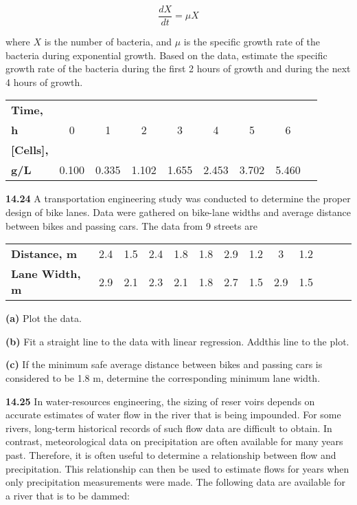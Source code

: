 \documentclass[../main.tex]{subfiles}
\begin{document}
\begin{multicols}{2}
	$$\frac{d X}{dt} = \mu X$$

	\noindent where $X$ is the number of bacteria, and $\mu$ is the specific
	growth rate of the bacteria during exponential growth. Based
	on the data, estimate the specific growth rate of the bacteria
	during the first 2 hours of growth and during the next 4 hours
	of growth.

	\noindent \begin{tabular}{l c c c c c c c c}
		\textbf{Time,} \\
		\textbf{h} &  0 &  1 &  2 &  3 &  4 &  5 &  6 \\
		\textbf{[Cells],} \\
		\textbf{g/L} & 0.100 & 0.335 & 1.102 & 1.655 & 2.453 & 3.702 & 5.460
	\end{tabular}

	\noindent\textbf{14.24} A transportation engineering study was conducted to
	determine the proper design of bike lanes. Data were gathered on bike-lane widths and average distance between bikes
	and passing cars. The data from 9 streets are

	\noindent \begin{tabular}{l c c c c c c c c c c c c}
		\textbf{Distance, m} & 2.4 & 1.5 & 2.4 & 1.8 & 1.8 & 2.9 & 1.2 & 3 & 1.2 \\
		\textbf{Lane Width, m} & 2.9 & 2.1 & 2.3 & 2.1 & 1.8 & 2.7 & 1.5 & 2.9 & 1.5
	\end{tabular}

	\noindent \textbf{(a)} Plot the data.

	\noindent \textbf{(b)} Fit a straight line to the data with linear regression. Addthis line to the plot.

	\noindent \textbf{(c)} If the minimum safe average distance between bikes and passing cars is considered to be 1.8 m, determine the corresponding minimum lane width.

	\noindent\textbf{14.25}  In water-resources engineering, the sizing of reser	voirs depends on accurate estimates of water flow in the
	river that is being impounded. For some rivers, long-term
	historical records of such flow data are difficult to obtain. In
	contrast, meteorological data on precipitation are often
	available for many years past. Therefore, it is often useful to determine a relationship between flow and precipitation.
	This relationship can then be used to estimate flows for
	years when only precipitation measurements were made.
	The following data are available for a river that is to be
	dammed:


\end{multicols}
\end{document}
